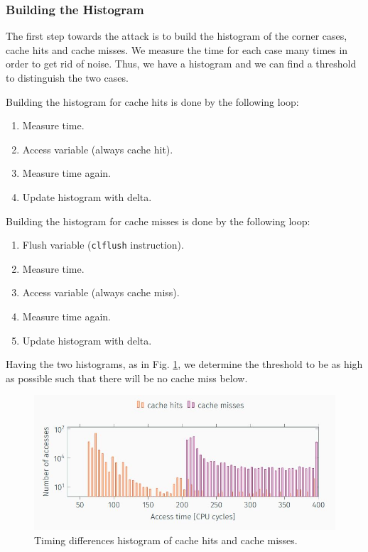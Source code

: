 \subsubsection{Building the Histogram}
\label{subsec:buildingthehistogram}
The first step towards the attack is to build the histogram of the corner cases, cache hits and cache misses. We measure the time for each case many times in order to get rid of noise. Thus, we have a histogram and we can find a threshold to distinguish the two cases.

\noindent Building the histogram for cache hits is done by the following loop:
\begin{enumerate}
    \item Measure time.
    \item Access variable (always cache hit).
    \item Measure time again.
    \item Update histogram with delta.
\end{enumerate}

\noindent Building the histogram for cache misses is done by the following loop:
\begin{enumerate}
    \item Flush variable (\texttt{clflush} instruction).
    \item Measure time.
    \item Access variable (always cache miss).
    \item Measure time again.
    \item Update histogram with delta.
\end{enumerate}

\noindent Having the two histograms, as in Fig. \ref{cache_hits_misses_hist:fig}, we determine the threshold to be as high as possible such that there will be no cache miss below. 
\begin{figure}[h]
    \centering
    \includegraphics[width=\textwidth]{images/cache_hits_misses_hist.JPG}
    \caption{Timing differences histogram of cache hits and cache misses.}
    \label{cache_hits_misses_hist:fig}
\end{figure}

